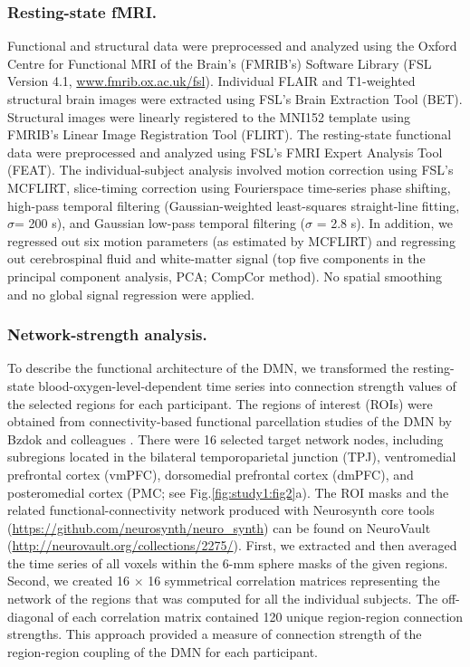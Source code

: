 \subsubsection{Resting-state fMRI.} 

Functional and structural data were preprocessed and analyzed using the Oxford Centre for Functional MRI of the Brain’s (FMRIB’s) Software Library (FSL Version 4.1, \url{www.fmrib.ox.ac.uk/fsl}). 
Individual FLAIR and T1-weighted structural brain images were extracted using FSL’s Brain Extraction Tool (BET). Structural images were linearly registered to the MNI152 template using FMRIB’s Linear Image Registration Tool (FLIRT). The resting-state functional data were preprocessed and analyzed using FSL’s FMRI Expert Analysis Tool (FEAT). The individual-subject analysis involved motion correction using FSL’s MCFLIRT, slice-timing correction using Fourierspace time-series phase shifting, high-pass temporal filtering (Gaussian-weighted least-squares straight-line fitting, $\sigma$= 200 s), and Gaussian low-pass temporal filtering ($\sigma$ = 2.8 s). In addition, we regressed out six motion parameters (as estimated by MCFLIRT) and regressing out cerebrospinal fluid and white-matter signal (top five components in the principal component analysis, PCA; CompCor method). No spatial smoothing and no global signal regression were applied.

\subsubsection{Network-strength analysis.} 

To describe the functional architecture of the DMN, we transformed the resting-state blood-oxygen-level-dependent time series into connection strength values of the selected regions for each participant. The regions of interest (ROIs) were obtained from connectivity-based functional parcellation studies of the DMN by Bzdok and colleagues
\cite{Bzdok2013,Bzdok2015,Bzdok2016,Eickhoff2016,Eickhoff2016}.
There were 16 selected target network nodes, including subregions located in the bilateral temporoparietal junction (TPJ), ventromedial prefrontal cortex (vmPFC), dorsomedial prefrontal cortex (dmPFC), and posteromedial cortex 
(PMC; see Fig.\ref{fig:study1:fig2}a). 
The ROI masks and the related functional-connectivity network produced with Neurosynth core tools 
(\url{https://github.com/neurosynth/neuro\_synth}) 
can be found on NeuroVault 
(\url{http://neurovault.org/collections/2275/}). First, we extracted and then averaged the time series of all voxels within the 6-mm sphere masks of the given regions. Second, we created 16 $\times$ 16 symmetrical correlation matrices representing the network of the regions that was computed for all the individual subjects. The off-diagonal of each correlation matrix contained 120 unique region-region connection strengths. This approach provided a measure of connection strength of the region-region coupling of the DMN for each participant.

